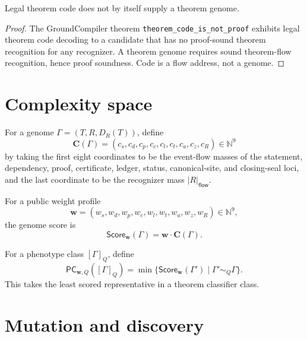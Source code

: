 \begin{theorem}
\label{thm:theorem-genome-code-not-genome}
Legal theorem code does not by itself supply a theorem genome.
\end{theorem}
\begin{proof}
The GroundCompiler theorem \texttt{theorem\_code\_is\_not\_proof} exhibits
legal theorem code decoding to a candidate that has no proof-sound theorem
recognition for any recognizer. A theorem genome requires sound theorem-flow
recognition, hence proof soundness. Code is a flow address, not a genome.
\end{proof}

\section{Complexity space}
\label{sec:theorem-genome-complexity-space}

\begin{definition}
\label{def:theorem-genome-complexity-vector}
For a genome $\Gamma=(T,R,D_R(T))$, define
$$
\mathbf C(\Gamma)=
(c_s,c_d,c_p,c_c,c_l,c_t,c_a,c_z,c_R)\in\mathbb N^9
$$
by taking the first eight coordinates to be the event-flow masses of the
statement, dependency, proof, certificate, ledger, status, canonical-site, and
closing-seal loci, and the last coordinate to be the recognizer mass
$|R|_{\mathsf{flow}}$.
\end{definition}

\begin{definition}
\label{def:theorem-genome-score}
For a public weight profile
$$
\mathbf w=(w_s,w_d,w_p,w_c,w_l,w_t,w_a,w_z,w_R)\in\mathbb N^9,
$$
the genome score is
$$
\mathsf{Score}_{\mathbf w}(\Gamma)
=
\mathbf w\cdot\mathbf C(\Gamma).
$$
\end{definition}

\begin{definition}
\label{def:theorem-genome-phenotype-complexity}
For a phenotype class $[\Gamma]_Q$, define
$$
\mathsf{PC}_{\mathbf w,Q}([\Gamma]_Q)
=
\min\{\mathsf{Score}_{\mathbf w}(\Gamma')\mid
\Gamma'\sim_Q\Gamma\}.
$$
This takes the least scored representative in a theorem classifier class.
\end{definition}

\section{Mutation and discovery}
\label{sec:theorem-genome-mutation-discovery}

